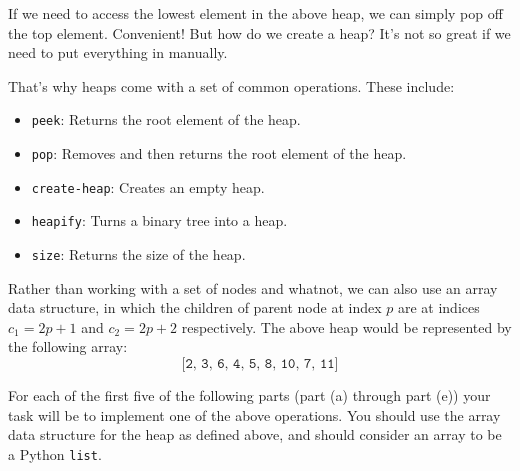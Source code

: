 \documentclass[addpoints]{exam}
\begin{document}
\begin{questions}
If we need to access the lowest element in the above heap, we can simply pop off the top element. Convenient! But how do we create a heap? It's not so great if we need to put everything in manually. 

That's why heaps come with a set of common operations. These include:

\begin{itemize}
    \item \texttt{peek}: Returns the root element of the heap.
    \item \texttt{pop}: Removes and then returns the root element of the heap.
    \item \texttt{create-heap}: Creates an empty heap.
    \item \texttt{heapify}: Turns a binary tree into a heap.
    \item \texttt{size}: Returns the size of the heap.
\end{itemize}

Rather than working with a set of nodes and whatnot, we can also use an array data structure, in which the children of parent node at index $p$ are at indices $c_1 = 2p+1$ and $c_2 = 2p + 2$ respectively. The above heap would be represented by the following array: 
$$\texttt{[2, 3, 6, 4, 5, 8, 10, 7, 11]}$$

For each of the first five of the following parts (part (a) through part (e)) your task will be to implement one of the above operations. You should use the array data structure for the heap as defined above, and should consider an array to be a Python \texttt{list}. 

\newpage

\end{questions}
\end{document}
